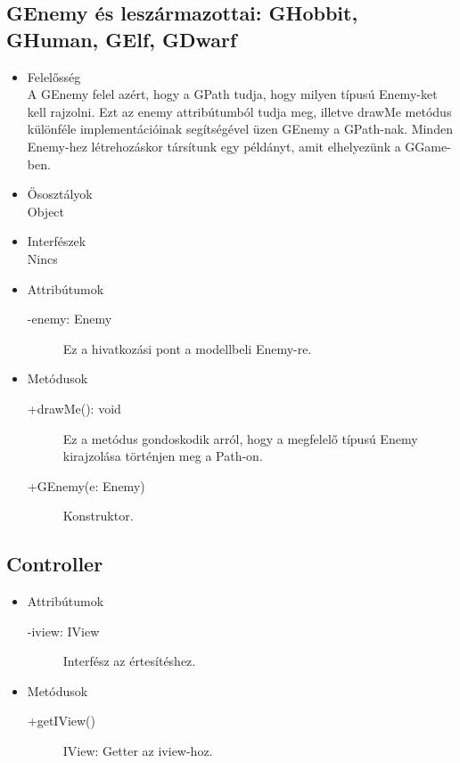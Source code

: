 \subsection{GEnemy és leszármazottai: GHobbit, GHuman, GElf, GDwarf}
\begin{itemize}
\item Felelősség\\
A GEnemy felel azért, hogy a GPath tudja, hogy milyen típusú Enemy-ket kell rajzolni. Ezt az enemy attribútumból tudja meg, illetve drawMe metódus különféle implementációinak segítségével üzen GEnemy a GPath-nak. Minden Enemy-hez létrehozáskor társítunk egy példányt, amit elhelyezünk a GGame-ben.
\item Ősosztályok\\
Object
\item Interfészek\\
Nincs
\item Attribútumok\\
	\begin{description}
		\item[-enemy: Enemy] Ez a hivatkozási pont a modellbeli Enemy-re.
\end{description}
\item Metódusok\\
	\begin{description}
		\item[+drawMe(): void] Ez a metódus gondoskodik arról, hogy a megfelelő típusú Enemy kirajzolása történjen meg a Path-on.
		\item[+GEnemy(e: Enemy)] Konstruktor.
	\end{description}
\end{itemize}

\subsection{Controller}
\begin{itemize}
\item Attribútumok\\
	\begin{description}
		\item[-iview: IView] Interfész az értesítéshez.
\end{description}
\item Metódusok\\
	\begin{description}
		\item[+getIView()] IView: Getter az iview-hoz.
	\end{description}
\end{itemize}

